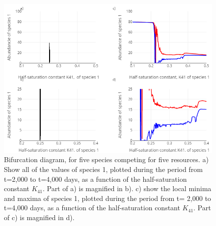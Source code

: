 \begin{figure}[H]
\begin{center} 
 \includegraphics[width=1\textwidth]{../Code/Figures/Figure_3.png}
  \caption{Bifurcation diagram, for five species competing for five resources. 
a) Show all of the values of species 1, plotted during the period from t=2,000 
to t=4,000 days, as a function of the half-saturation constant $K_{41}$. Part of a) 
is magnified in b). c) show the local minima and maxima of species 1, plotted 
during the period from t= 2,000 to t=4,000 days, as a function of the 
half-saturation constant $K_{41}$. Part of c) is magnified in d).}
  \label{figures:Fig3}
\end{center}
\end{figure}

